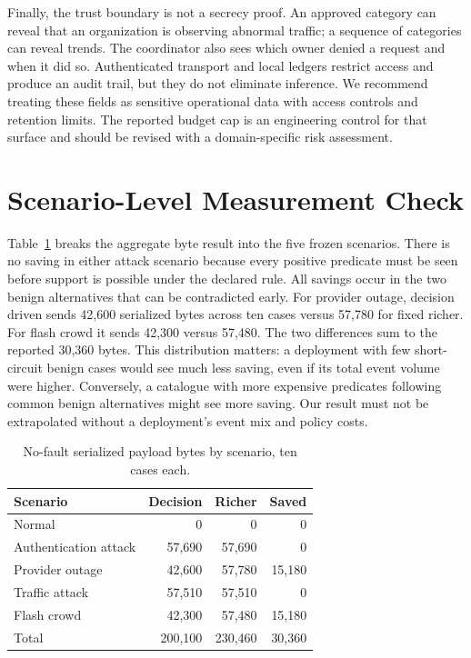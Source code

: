 \documentclass[conference,letterpaper]{IEEEtran}
\begin{document}
Finally, the trust boundary is not a secrecy proof. An approved category can reveal that an organization is observing abnormal traffic; a sequence of categories can reveal trends. The coordinator also sees which owner denied a request and when it did so. Authenticated transport and local ledgers restrict access and produce an audit trail, but they do not eliminate inference. We recommend treating these fields as sensitive operational data with access controls and retention limits. The reported budget cap is an engineering control for that surface and should be revised with a domain-specific risk assessment.

\section{Scenario-Level Measurement Check}
Table~\ref{tab:scenarios} breaks the aggregate byte result into the five frozen scenarios. There is no saving in either attack scenario because every positive predicate must be seen before support is possible under the declared rule. All savings occur in the two benign alternatives that can be contradicted early. For provider outage, decision driven sends 42,600 serialized bytes across ten cases versus 57,780 for fixed richer. For flash crowd it sends 42,300 versus 57,480. The two differences sum to the reported 30,360 bytes. This distribution matters: a deployment with few short-circuit benign cases would see much less saving, even if its total event volume were higher. Conversely, a catalogue with more expensive predicates following common benign alternatives might see more saving. Our result must not be extrapolated without a deployment's event mix and policy costs.

\begin{table}[t]
\centering\caption{No-fault serialized payload bytes by scenario, ten cases each.}
\label{tab:scenarios}\scriptsize
\begin{tabular}{lrrr}\hline
Scenario & Decision & Richer & Saved \\\hline
Normal & 0 & 0 & 0\\
Authentication attack & 57,690 & 57,690 & 0\\
Provider outage & 42,600 & 57,780 & 15,180\\
Traffic attack & 57,510 & 57,510 & 0\\
Flash crowd & 42,300 & 57,480 & 15,180\\\hline
Total & 200,100 & 230,460 & 30,360\\\hline
\end{tabular}
\end{table}
\end{document}

